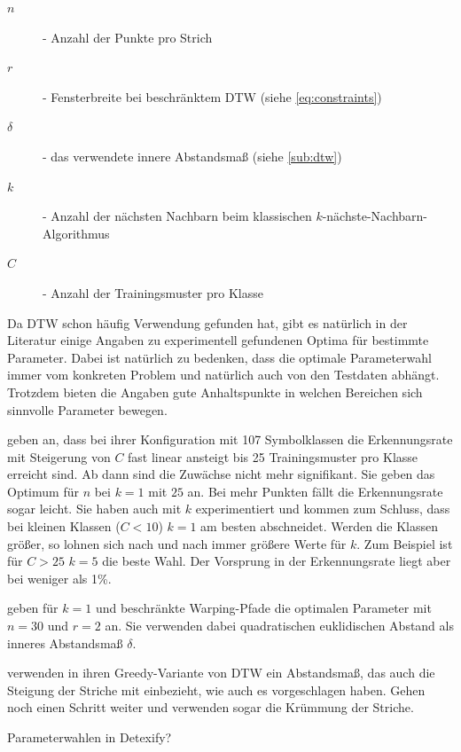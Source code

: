 \begin{description}
  \item[$n$] - Anzahl der Punkte pro Strich
  \item[$r$] - Fensterbreite bei beschränktem DTW (siehe \ref{eq:constraints})
  \item[$\delta$] - das verwendete innere Abstandsmaß (siehe \ref{sub:dtw})
  \item[$k$] - Anzahl der nächsten Nachbarn beim klassischen $k$-nächste-Nachbarn-Algorithmus
  \item[$C$] - Anzahl der Trainingsmuster pro Klasse
\end{description}

Da DTW schon häufig Verwendung gefunden hat, gibt es natürlich in der Literatur einige Angaben zu experimentell gefundenen Optima für bestimmte Parameter. Dabei ist natürlich zu bedenken, dass die optimale Parameterwahl immer vom konkreten Problem und natürlich auch von den Testdaten abhängt. Trotzdem bieten die Angaben gute Anhaltspunkte in welchen Bereichen sich sinnvolle Parameter bewegen.

\citet{Golubitsky:2009p1842} geben an, dass bei ihrer Konfiguration mit 107 Symbolklassen die Erkennungsrate mit Steigerung von $C$ fast linear ansteigt bis 25 Trainingsmuster pro Klasse erreicht sind. Ab dann sind die Zuwächse nicht mehr signifikant. Sie geben das Optimum für $n$ bei $k = 1$ mit $25$ an. Bei mehr Punkten fällt die Erkennungsrate sogar leicht. Sie haben auch mit $k$ experimentiert und kommen zum Schluss, dass bei kleinen Klassen ($C<10$) $k = 1$ am besten abschneidet. Werden die Klassen größer, so lohnen sich nach und nach immer größere Werte für $k$. Zum Beispiel ist für $C>25$  $k=5$ die beste Wahl. Der Vorsprung in der Erkennungsrate liegt aber bei weniger als 1\%.

\citet{Golubitsky:2009p2433} geben für $k=1$ und beschränkte Warping-Pfade die optimalen Parameter mit $n = 30$ und $r = 2$ an. Sie verwenden dabei quadratischen euklidischen Abstand als inneres Abstandsmaß $\delta$.

\citet{MacLean:2010p9970} verwenden in ihren Greedy-Variante von DTW ein Abstandsmaß, das auch die Steigung der Striche mit einbezieht, wie auch \citet{Tappert:1982p10305} es vorgeschlagen haben.
\citet{Vuong:2010p10279} Gehen noch einen Schritt weiter und verwenden sogar die Krümmung der Striche.

\TODO Parameterwahlen in Detexify?
